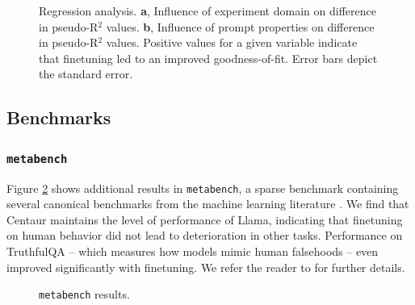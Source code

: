 \documentclass[pdflatex,sn-nature]{sn-jnl}%
\theoremstyle{thmstyleone}%
\theoremstyle{thmstyletwo}%
\theoremstyle{thmstylethree}%
\begin{document}
\begin{figure}[H]
    \centering
    \caption{Regression analysis. \textbf{a}, Influence of experiment domain on difference in pseudo-R$^2$ values. \textbf{b}, Influence of prompt properties on difference in pseudo-R$^2$ values. Positive values for a given variable indicate that finetuning led to an improved goodness-of-fit. Error bars depict the standard error.}
    \label{fig:regression}
\end{figure}

\subsection*{Benchmarks}

\subsubsection*{\texttt{metabench}}

Figure \ref{fig:metabench} shows additional results in \texttt{metabench}, a sparse benchmark containing several canonical benchmarks from the machine learning literature \cite{kipnis2024texttt}. We find that Centaur maintains the level of performance of Llama, indicating that finetuning on human behavior did not lead to deterioration in other tasks. Performance on TruthfulQA \cite{DBLP:journals/corr/abs-2109-07958} -- which measures how models mimic human falsehoods -- even improved significantly with finetuning. We refer the reader to \cite{kipnis2024texttt} for further details.

\begin{figure}[H]
    \centering
    \caption{\texttt{metabench} \cite{kipnis2024texttt} results. }
    \label{fig:metabench}
\end{figure}
\end{document}
